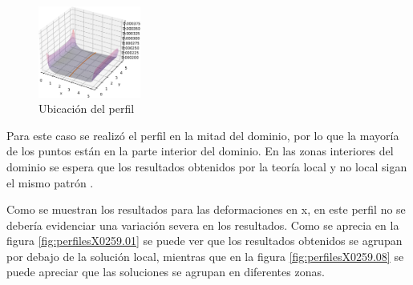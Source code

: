 	\begin{figure}
		\sffamily
		\begin{center}
			\includegraphics[width=0.3\textwidth]{figuras/Placa/defx_bonita_X2.519.pdf}
		\end{center}
		\caption{Ubicación del perfil}
		\label{fig:defxbonitax2519}
	\end{figure}
	Para este caso se realizó el perfil en la mitad del dominio, por lo que la mayoría de los puntos están en la parte interior del dominio. En las zonas interiores del dominio se espera que los resultados obtenidos por la teoría local y no local sigan el mismo patrón \parencite{Pisano2009}.

	Como se muestran los resultados para las deformaciones en x, en este perfil no se debería evidenciar una variación severa en los resultados. Como se aprecia en la figura \ref{fig:perfilesX0259.01} se puede ver que los resultados obtenidos se agrupan por debajo de la solución local, mientras que en la figura \ref{fig:perfilesX0259.08} se puede apreciar que las soluciones se agrupan en diferentes zonas.\newline\newline\newline\newline\newline\newline



